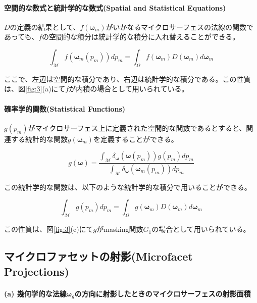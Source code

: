 \documentclass[a4j,xelatex,ja=standard]{bxjsarticle}
\begin{document}
\paragraph{空間的な数式と統計学的な数式(Spatial and Statistical Equations)}

$D$の定義の結果として、$f(\boldsymbol{\omega}_m)$がいかなるマイクロサーフェスの法線の関数であっても、$f$の空間的な積分は統計学的な積分に入れ替えることができる。

\begin{equation}
    \int_{\mathcal M} f(\boldsymbol{\omega}_m(p_m))dp_m = \int_{\Omega}f(\boldsymbol{\omega}_m) D(\boldsymbol{\omega}_m)d\boldsymbol{\omega}_m
    \label{eq:6}
\end{equation}

ここで、左辺は空間的な積分であり、右辺は統計学的な積分である。この性質は、図\ref{fig:3}(a)にて$f$が内積の場合として用いられている。

\paragraph{確率学的関数(Statistical Functions)}

$g(p_m)$がマイクロサーフェス上に定義された空間的な関数であるとすると、関連する統計的な関数$g(\boldsymbol{\omega}_m)$を定義することができる。

\begin{equation}
    g(\boldsymbol{\omega}) = \frac{\int_{\mathcal M} \delta_{\boldsymbol{\omega}}(\boldsymbol{\omega}(p_m)) g(p_m) dp_m}{\int_{\mathcal M} \delta_{\boldsymbol{\omega}}(\boldsymbol{\omega}_m(p_m)) dp_m}
    \label{eq:7}
\end{equation}

この統計学的な関数は、以下のような統計学的な積分で用いることができる。

\begin{equation}
    \int_{\mathcal M} g(p_m)dp_m = \int_{\Omega}g(\boldsymbol{\omega}_m) D(\boldsymbol{\omega}_m)d\boldsymbol{\omega}_m
    \label{eq:8}
\end{equation}

この性質は、図\ref{fig:3}(c)にて$g$がmasking関数$G_1$の場合として用いられている。

\subsection{マイクロファセットの射影(Microfacet Projections)}
\label{sec:2.3}

\paragraph{(a) 幾何学的な法線$\boldsymbol{\omega}_g$の方向に射影したときのマイクロサーフェスの射影面積}
\end{document}
